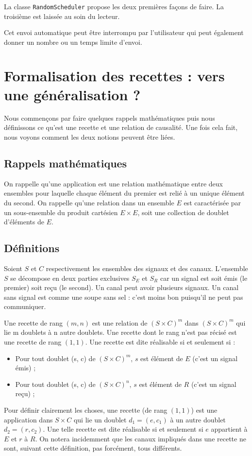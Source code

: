 \documentclass[11pt]{article}
\begin{document}
La classe \texttt{RandomScheduler} propose les deux premières façons de faire. La troisième est laissée au soin du lecteur.

Cet envoi automatique peut être interrompu par l'utilisateur qui peut également donner un nombre ou un temps limite d'envoi.

\section{Formalisation des recettes : vers une généralisation ?}

Nous commençons par faire quelques rappels mathématiques puis nous définissons ce qu'est une recette et une relation de causalité. Une fois cela fait, nous voyons comment les deux notions peuvent être liées.

\subsection{Rappels mathématiques}

On rappelle qu'une application est une relation mathématique entre deux ensembles pour laquelle chaque élément du premier est relié à un unique élément du second. On rappelle qu'une relation dans un ensemble $E$ est caractérisée par un sous-ensemble du produit cartésien $E × E$, soit une collection de doublet d'éléments de $E$.

\subsection{Définitions}

Soient $S$ et $C$ respectivement les ensembles des signaux et des canaux. L'ensemble $S$ se décompose en deux parties exclusives $S_E$ et $S_R$ car un signal est soit émis (le premier) soit reçu (le second). Un canal peut avoir plusieurs signaux. Un canal sans signal est comme une soupe sans sel : c'est moins bon puisqu'il ne peut pas communiquer.

Une recette de rang $(m, n)$ est une relation de $\left(S×C\right)^m$ dans $\left(S×C\right)^m$ qui lie m doublets à n autre doublets. Une recette dont le rang n'est pas récisé est une recette de rang $(1, 1)$. Une recette est dite réalisable si et seulement si :
\begin{itemize}
\item Pour tout doublet (s, c) de $\left(S×C\right)^m$, $s$ est élément de $E$ (c'est un signal émis) ;
\item Pour tout doublet (s, c) de $\left(S×C\right)^n$, $s$ est élément de $R$ (c'est un signal reçu) ;
\end{itemize}
Pour définir clairement les choses, une recette (de rang $(1, 1)$) est une application dans $S×C$ qui lie un doublet $d_1 = (e, c_1)$ à un autre doublet $d_2 = (r, c_2)$. Une telle recette est dite réalisable si et seulement si $e$ appartient à $E$ et $r$ à $R$. On notera incidemment que les canaux impliqués dans une recette ne sont, suivant cette définition, pas forcément, tous différents.
\end{document}
